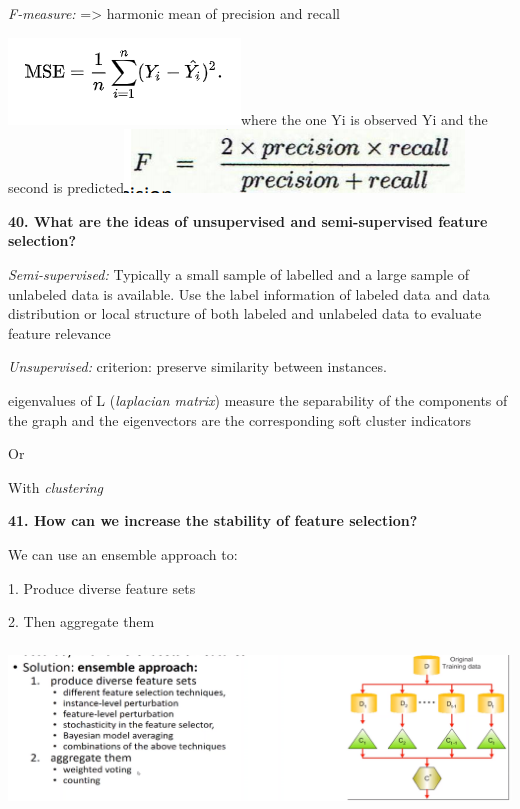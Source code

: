 \textit{F-measure:} =\textgreater{} harmonic mean of precision and
recall

\includegraphics[width=2.42708in,height=0.90625in]{media/image12.png}where
the one Yi is observed Yi and the second is
predicted\includegraphics[width=3.55208in,height=0.66667in]{media/image38.png}

\textbf{40. What are the ideas of unsupervised and semi-supervised
feature selection?}

\textit{Semi-supervised:} Typically a small sample of labelled and a
large sample of unlabeled data is available. Use the label information
of labeled data and data distribution or local structure of both labeled
and unlabeled data to evaluate feature relevance

\textit{Unsupervised:} criterion: preserve similarity between
instances.

eigenvalues of L (\emph{laplacian matrix}) measure the separability of
the components of the graph and the eigenvectors are the corresponding
soft cluster indicators

Or

With \emph{clustering}

\textbf{41. How can we increase the stability of feature selection?}

We can use an ensemble approach to:

1. Produce diverse feature sets

2. Then aggregate them

\includegraphics[width=5.91146in,height=1.71993in]{media/image36.png}

